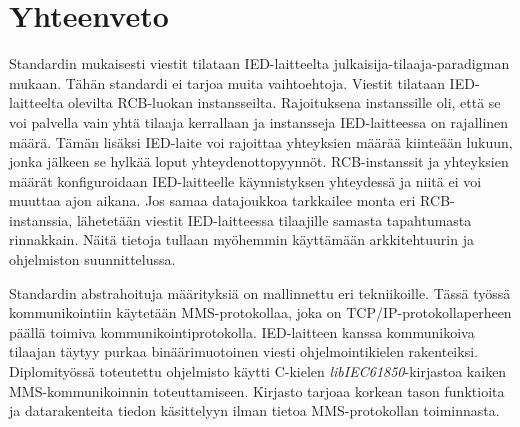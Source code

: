 \section{Yhteenveto}
Standardin mukaisesti viestit tilataan IED-laitteelta julkaisija-tilaaja-paradigman mukaan. Tähän standardi ei tarjoa muita vaihtoehtoja. Viestit tilataan IED-laitteelta olevilta RCB-luokan instansseilta. Rajoituksena instanssille oli, että se voi palvella vain yhtä tilaaja kerrallaan ja instansseja IED-laitteessa on rajallinen määrä. Tämän lisäksi IED-laite voi rajoittaa yhteyksien määrää kiinteään lukuun, jonka jälkeen se hylkää loput yhteydenottopyynnöt. RCB-instanssit ja yhteyksien määrät konfiguroidaan IED-laitteelle käynnistyksen yhteydessä ja niitä ei voi muuttaa ajon aikana. Jos samaa datajoukkoa tarkkailee monta eri RCB-instanssia, lähetetään viestit IED-laitteessa tilaajille samasta tapahtumasta rinnakkain. Näitä tietoja tullaan myöhemmin käyttämään arkkitehtuurin ja ohjelmiston suunnittelussa.

Standardin abstrahoituja määrityksiä on mallinnettu eri tekniikoille. Tässä työssä kommunikointiin käytetään MMS-protokollaa, joka on TCP/IP-protokollaperheen päällä toimiva kommunikointiprotokolla. IED-laitteen kanssa kommunikoiva tilaajan täytyy purkaa binäärimuotoinen viesti ohjelmointikielen rakenteiksi. Diplomityössä toteutettu ohjelmisto käytti C-kielen \emph{libIEC61850}-kirjastoa kaiken MMS-kommunikoinnin toteuttamiseen. Kirjasto tarjoaa korkean tason funktioita ja datarakenteita tiedon käsittelyyn ilman tietoa MMS-protokollan toiminnasta. \mbox{\cite{IEC61850-8-1}}